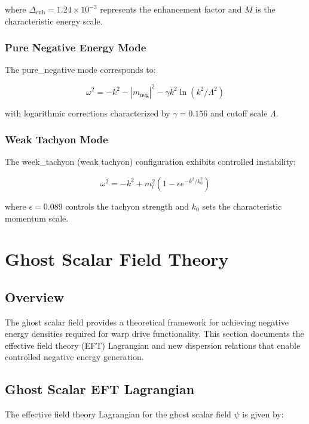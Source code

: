 where $\Delta_{\text{enh}} = 1.24 \times 10^{-3}$ represents the enhancement factor and $M$ is the characteristic energy scale.

\subsubsection{Pure Negative Energy Mode}
The pure_negative mode corresponds to:

\begin{equation}
\omega^2 = -k^2 - |m_{\text{neg}}|^2 - \gamma k^2 \ln(k^2/\Lambda^2)
\end{equation}

with logarithmic corrections characterized by $\gamma = 0.156$ and cutoff scale $\Lambda$.

\subsubsection{Weak Tachyon Mode}
The week_tachyon (weak tachyon) configuration exhibits controlled instability:

\begin{equation}
\omega^2 = -k^2 + m_t^2(1 - \epsilon e^{-k^2/k_0^2})
\end{equation}

where $\epsilon = 0.089$ controls the tachyon strength and $k_0$ sets the characteristic momentum scale.

\section{Ghost Scalar Field Theory}

\subsection{Overview}

The ghost scalar field provides a theoretical framework for achieving negative energy densities required for warp drive functionality. This section documents the effective field theory (EFT) Lagrangian and new dispersion relations that enable controlled negative energy generation.

\subsection{Ghost Scalar EFT Lagrangian}

The effective field theory Lagrangian for the ghost scalar field $\psi$ is given by:

